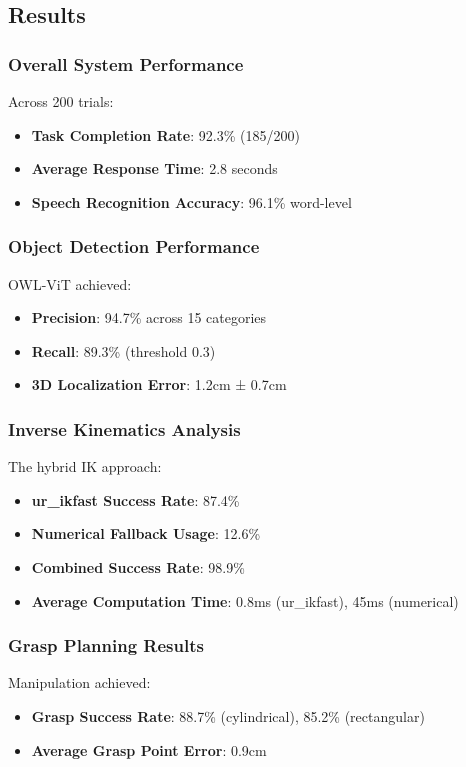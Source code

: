 \documentclass[conference]{IEEEtran}
\begin{document}
\subsection{Results}

\subsubsection{Overall System Performance}
Across 200 trials:
\begin{itemize}
    \item \textbf{Task Completion Rate}: 92.3\% (185/200)
    \item \textbf{Average Response Time}: 2.8 seconds
    \item \textbf{Speech Recognition Accuracy}: 96.1\% word-level
\end{itemize}

\subsubsection{Object Detection Performance}
OWL-ViT achieved:
\begin{itemize}
    \item \textbf{Precision}: 94.7\% across 15 categories
    \item \textbf{Recall}: 89.3\% (threshold 0.3)
    \item \textbf{3D Localization Error}: 1.2cm ± 0.7cm
\end{itemize}

\subsubsection{Inverse Kinematics Analysis}
The hybrid IK approach:
\begin{itemize}
    \item \textbf{ur\_ikfast Success Rate}: 87.4\%
    \item \textbf{Numerical Fallback Usage}: 12.6\%
    \item \textbf{Combined Success Rate}: 98.9\%
    \item \textbf{Average Computation Time}: 0.8ms (ur\_ikfast), 45ms (numerical)
\end{itemize}

\subsubsection{Grasp Planning Results}
Manipulation achieved:
\begin{itemize}
    \item \textbf{Grasp Success Rate}: 88.7\% (cylindrical), 85.2\% (rectangular)
    \item \textbf{Average Grasp Point Error}: 0.9cm
\end{itemize}
\end{document}

